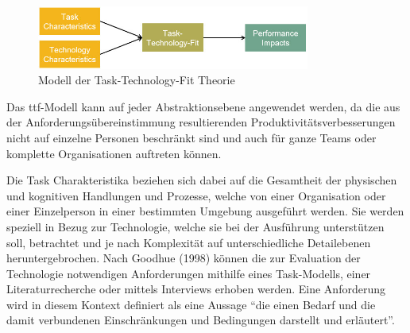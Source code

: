 \begin{figure}[h]
    \centering
    \includegraphics[width=0.8\textwidth]{img/TTF_einfach.jpg}
    \caption[Modell der Task-Technology-Fit Theorie]{Modell der Task-Technology-Fit Theorie\autocite{TTF}}
    \label{fig:TTF}
\end{figure}

Das \acs{ttf}-Modell kann auf jeder Abstraktionsebene angewendet werden, da die aus der Anforderungsübereinstimmung resultierenden Produktivitätsverbesserungen nicht auf einzelne Personen beschränkt sind und auch für ganze Teams oder komplette Organisationen auftreten können.\autocite[Vgl.][S. 1827f]{GOODHUE1995b} 



Die Task Charakteristika beziehen sich dabei auf die Gesamtheit der physischen und kognitiven Handlungen und Prozesse, welche von einer Organisation oder einer Einzelperson in einer bestimmten Umgebung ausgeführt werden. Sie werden speziell in Bezug zur Technologie, welche sie bei der Ausführung unterstützen soll, betrachtet und je nach Komplexität auf unterschiedliche Detailebenen heruntergebrochen. \autocite[Vgl.][S. 398]{SPIES2020} Nach Goodhue (1998) können die zur Evaluation der Technologie notwendigen Anforderungen mithilfe eines Task-Modells, einer Literaturrecherche oder mittels Interviews erhoben werden.\autocite[Vgl.][S. 126]{GOODHUE1998} Eine Anforderung wird in diesem Kontext definiert als eine Aussage \enquote{die einen Bedarf und die damit verbundenen Einschränkungen und Bedingungen darstellt und erläutert}.\autocite[Vgl.][]{ISO2017}

